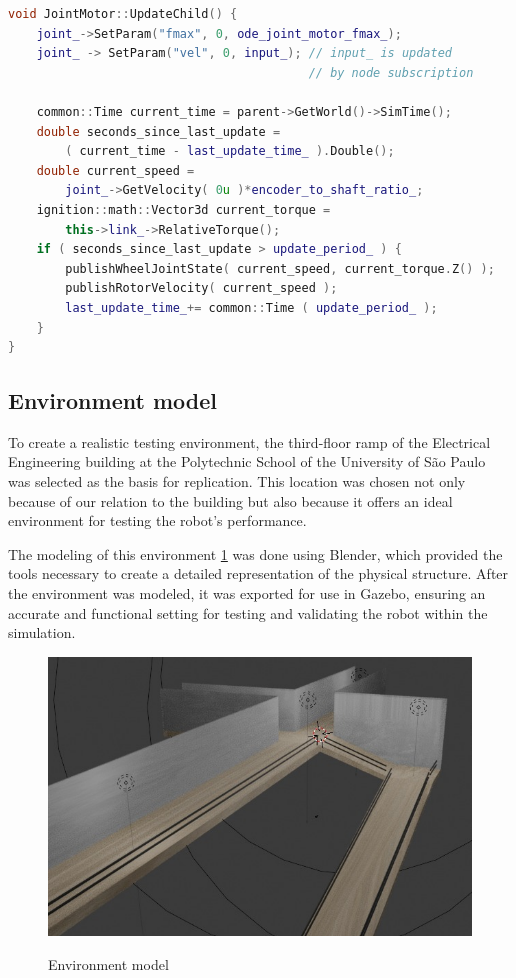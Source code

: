 \documentclass[../../monografia.tex]{subfiles}
\begin{document}
\begin{lstlisting}[language=C++, caption={Joint motor update function}]
void JointMotor::UpdateChild() {
    joint_->SetParam("fmax", 0, ode_joint_motor_fmax_);
    joint_ -> SetParam("vel", 0, input_); // input_ is updated 
                                          // by node subscription

    common::Time current_time = parent->GetWorld()->SimTime();
    double seconds_since_last_update = 
        ( current_time - last_update_time_ ).Double();
    double current_speed = 
        joint_->GetVelocity( 0u )*encoder_to_shaft_ratio_;
    ignition::math::Vector3d current_torque = 
        this->link_->RelativeTorque();
    if ( seconds_since_last_update > update_period_ ) {
        publishWheelJointState( current_speed, current_torque.Z() );
        publishRotorVelocity( current_speed );
        last_update_time_+= common::Time ( update_period_ );
    }
}
\end{lstlisting}

\subsection{Environment model}

To create a realistic testing environment, the third-floor ramp of the Electrical Engineering building  at the Polytechnic School of the University of São Paulo was selected as the basis for replication. This location was chosen not only because of our relation to the building but also because it offers an ideal environment for testing the robot’s performance.

The modeling of this environment \ref{fig: Environment model} was done using Blender, which provided the tools necessary to create a detailed representation of the physical structure. After the environment was modeled, it was exported for use in Gazebo, ensuring an accurate and functional setting for testing and validating the robot within the simulation.

\begin{figure}[h!]
    \caption{Environment model}
    \centering
    \includegraphics[width=16cm]{src/images/ThirdFloor.jpeg}
    \label{fig: Environment model}
\end{figure}
\end{document}
